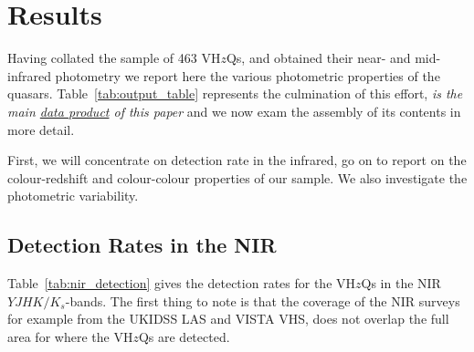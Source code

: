 \documentclass[usenatbib]{mnras}
\begin{document}
\begin{landscape}
 
\end{landscape}

\section{Results}
Having collated the sample of 463 VH$z$Qs, and obtained their near-
and mid-infrared photometry we report here the various photometric
properties of the quasars.
Table~\ref{tab:output_table} represents the culmination of this
effort, {\it is the main
\href{https://github.com/d80b2t/VHzQ/blob/master/data/VHzQs_ZYJHK_WISE.dat}{data
product} of this paper} and we now exam the assembly of its contents
in more detail. 

First, we will concentrate on detection rate in the infrared, go on to
report on the colour-redshift and colour-colour properties of our sample. 
We also investigate the photometric variability. 

\subsection{Detection Rates in the NIR}
Table~\ref{tab:nir_detection} gives the detection rates for the 
VH$z$Qs in the NIR $YJHK/K_{s}$-bands. 
The first thing to note is that the coverage of the NIR surveys 
for example from the UKIDSS LAS and VISTA VHS, does
not overlap the full area for where the VH$z$Qs are detected. 
\end{document}
